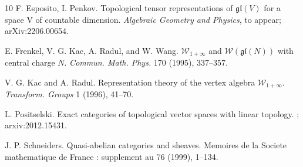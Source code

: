 \documentclass[12pt,reqno]{amsart}
\theoremstyle{definition}
\theoremstyle{remark}
\begin{document}
\begin{thebibliography}{10}
F. Esposito, I. Penkov.
\newblock Topological tensor representations of $\mathfrak{gl}(V)$ for a space V of countable dimension.
\newblock \emph{Algebraic Geometry and Physics}, to appear;
\newblock arXiv:2206.00654.

E. Frenkel, V. G. Kac, A. Radul, and W. Wang.
\newblock $\mathcal{W}_{1+\infty}$ and $\mathcal{W}(\mathfrak{gl}(N))$ with central charge $N$.
\newblock \emph{Commun. Math. Phys.} 170 (1995), 337–357.


V. G. Kac and A. Radul. 
\newblock Representation theory of the vertex algebra $\mathcal{W}_{1+\infty}$.
\emph{Transform. Groups} 1 (1996), 41–70.


  



L. Positselski.
\newblock Exact categories of topological vector spaces with linear topology.
 ;
\newblock arxiv:2012.15431.


J. P. Schneiders.
\newblock Quasi-abelian categories and sheaves.
Memoires de la Societe mathematique de France : supplement au  76 (1999), 1--134.


\end{thebibliography}
\end{document}
